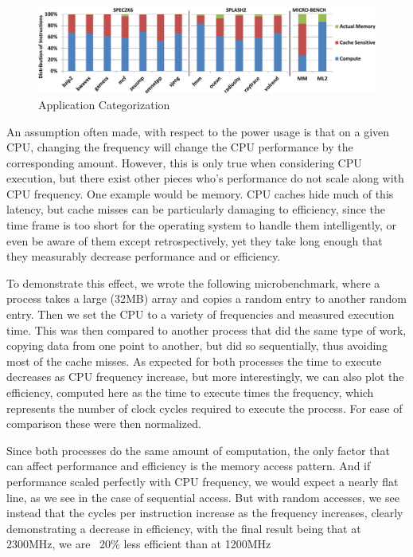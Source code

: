 \begin{figure}[htp]
  \begin{center}
\includegraphics[width=\linewidth]{figs/app-cat-crop.pdf}
  \end{center}
  \vspace{-0.1in}
  \caption{Application Categorization}
  \label{fig:dapp-cat}
\end{figure}



An assumption often made, with respect to the power usage 
is that on a given CPU, changing the frequency will change the CPU performance by the corresponding amount.
However, this is only true when considering CPU execution, 
but there exist other pieces who's performance do not scale along with CPU frequency.
One example would be memory. CPU caches hide much of this latency, but cache misses can be particularly damaging to efficiency, since the time frame is too short for the operating system to handle them intelligently, or even be aware of them except retrospectively, yet they take long enough that they measurably decrease performance and or efficiency.
 
To demonstrate this effect, we wrote the following microbenchmark, where a process takes a large (32MB) array and copies a random entry to another random entry. Then we set the CPU to a variety of frequencies and measured execution time.  This was then compared to another process that did the same type of work, copying data from one point to another, but did so sequentially, thus avoiding most of the cache misses. As expected for both processes the time to execute decreases as CPU frequency increase, but more interestingly, we can also plot the efficiency, computed here as the time to execute times the frequency, which represents the number of clock cycles required to execute the process. For ease of comparison these were then normalized.

 Since both processes do the same amount of computation, the only factor that can affect performance and efficiency is the memory access pattern. And if performance scaled perfectly with CPU frequency, we would expect a nearly flat line, as we see in the case of sequential access. But with random accesses, we see instead that the cycles per instruction increase as the frequency increases, clearly demonstrating a decrease in efficiency, with the final result being that at 2300MHz, we are ~20\% less efficient than at 1200MHz

